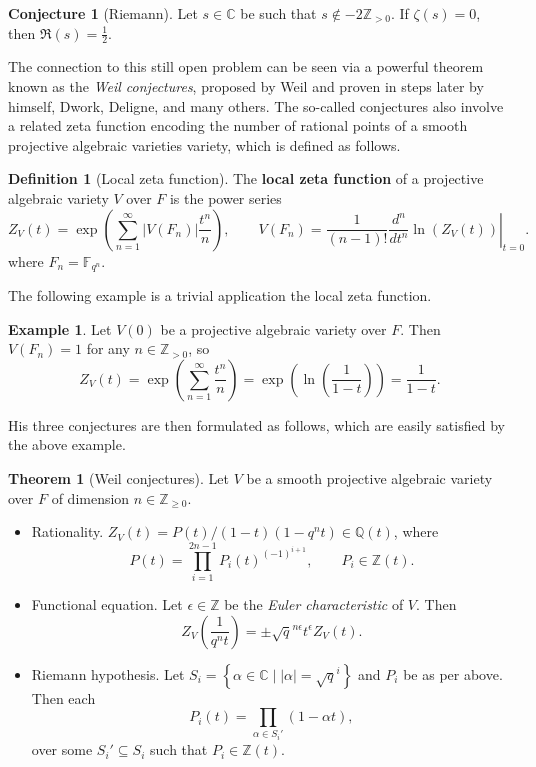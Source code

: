 \documentclass{article}
\newcommand{\F}{\mathbb{F}}
\newcommand{\Z}{\mathbb{Z}}
\newcommand{\Q}{\mathbb{Q}}
\newcommand{\C}{\mathbb{C}}
\newcommand{\val}[1]{\left. #1 \right\rvert}
\newcommand{\rb}[1]{\left( #1 \right)}
\newcommand{\cb}[1]{\left\{ #1 \right\}}
\newcommand{\abs}[1]{\left\lvert #1 \right\rvert}
\theoremstyle{definition}\newtheorem*{definition}{Definition}
\theoremstyle{definition}\newtheorem*{example}{Example}
\theoremstyle{definition}\newtheorem*{remark}{Remark}
\newtheorem{theorem}[proposition]{Theorem}
\newtheorem{conjecture}[proposition]{Conjecture}
\begin{document}
\begin{conjecture}[Riemann]
Let $ s \in \C $ be such that $ s \notin -2\Z_{> 0} $. If $ \zeta\rb{s} = 0 $, then $ \Re\rb{s} = \tfrac{1}{2} $.
\end{conjecture}

The connection to this still open problem can be seen via a powerful theorem known as the \emph{Weil conjectures}, proposed by Weil and proven in steps later by himself, Dwork, Deligne, and many others. The so-called conjectures also involve a related zeta function encoding the number of rational points of a smooth projective algebraic varieties variety, which is defined as follows.

\begin{definition}[Local zeta function]
The \textbf{local zeta function} of a projective algebraic variety $ V $ over $ F $ is the power series
$$ Z_V\rb{t} = \exp\rb{\sum_{n = 1}^\infty \abs{V\rb{F_n}}\dfrac{t^n}{n}}, \qquad V\rb{F_n} = \dfrac{1}{\rb{n - 1}!}\val{\dfrac{d^n}{dt^n}\ln\rb{Z_V\rb{t}}}_{t = 0}. $$
where $ F_n = \F_{q^n} $.
\end{definition}

The following example is a trivial application the local zeta function.

\begin{example}
Let $ V\rb{0} $ be a projective algebraic variety over $ F $. Then $ V\rb{F_n} = 1 $ for any $ n \in \Z_{> 0} $, so
$$ Z_V\rb{t} = \exp\rb{\sum_{n = 1}^\infty \dfrac{t^n}{n}} = \exp\rb{\ln\rb{\dfrac{1}{1 - t}}} = \dfrac{1}{1 - t}. $$
\end{example}

His three conjectures are then formulated as follows, which are easily satisfied by the above example.

\begin{theorem}[Weil conjectures]
\label{thm:weil}
Let $ V $ be a smooth projective algebraic variety over $ F $ of dimension $ n \in \Z_{\ge 0} $.
\begin{itemize}
\item Rationality. $ Z_V\rb{t} = P\rb{t} / \rb{1 - t}\rb{1 - q^nt} \in \Q\rb{t} $, where
$$ P\rb{t} = \prod_{i = 1}^{2n - 1} P_i\rb{t}^{\rb{-1}^{i + 1}}, \qquad P_i \in \Z\rb{t}. $$
\item Functional equation. Let $ \epsilon \in \Z $ be the \emph{Euler characteristic} of $ V $. Then
$$ Z_V\rb{\dfrac{1}{q^nt}} = \pm \sqrt{q}^{n\epsilon} t^\epsilon Z_V\rb{t}. $$
\item Riemann hypothesis. Let $ S_i = \cb{\alpha \in \C \mid \abs{\alpha} = \sqrt{q}^i} $ and $ P_i $ be as per above. Then each
$$ P_i\rb{t} = \prod_{\alpha \in S_i'} \rb{1 - \alpha t}, $$
over some $ S_i' \subseteq S_i $ such that $ P_i \in \Z\rb{t} $.
\end{itemize}
\end{theorem}
\end{document}
